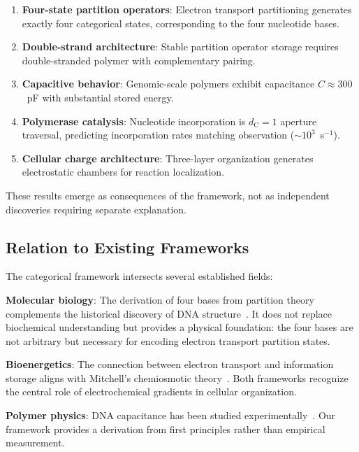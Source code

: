 \documentclass[twocolumn,aps,prb,superscriptaddress,longbibliography,floatfix]{revtex4-2}
\theoremstyle{remark}
\newcommand{\dC}{d_\text{C}}
\begin{document}
\begin{enumerate}
    \item \textbf{Four-state partition operators}: Electron transport
    partitioning generates exactly four categorical states, corresponding
    to the four nucleotide bases.

    \item \textbf{Double-strand architecture}: Stable partition operator
    storage requires double-stranded polymer with complementary pairing.

    \item \textbf{Capacitive behavior}: Genomic-scale polymers exhibit
    capacitance $C \approx 300$~pF with substantial stored energy.

    \item \textbf{Polymerase catalysis}: Nucleotide incorporation is
    $\dC = 1$ aperture traversal, predicting incorporation rates matching
    observation ($\sim 10^3$~s$^{-1}$).

    \item \textbf{Cellular charge architecture}: Three-layer organization
    generates electrostatic chambers for reaction localization.
\end{enumerate}

These results emerge as consequences of the framework, not as
independent discoveries requiring separate explanation.

\subsection{Relation to Existing Frameworks}

The categorical framework intersects several established fields:

\textbf{Molecular biology}: The derivation of four bases from partition
theory complements the historical discovery of DNA structure~\cite{Watson1953}.
It does not replace biochemical understanding but provides a physical
foundation: the four bases are not arbitrary but necessary for encoding
electron transport partition states.

\textbf{Bioenergetics}: The connection between electron transport and
information storage aligns with Mitchell's chemiosmotic
theory~\cite{Mitchell1961}. Both frameworks recognize the central role of
electrochemical gradients in cellular organization.

\textbf{Polymer physics}: DNA capacitance has been studied
experimentally~\cite{Kornyshev2007,Bloomfield1997}. Our framework
provides a derivation from first principles rather than empirical
measurement.
\end{document}
